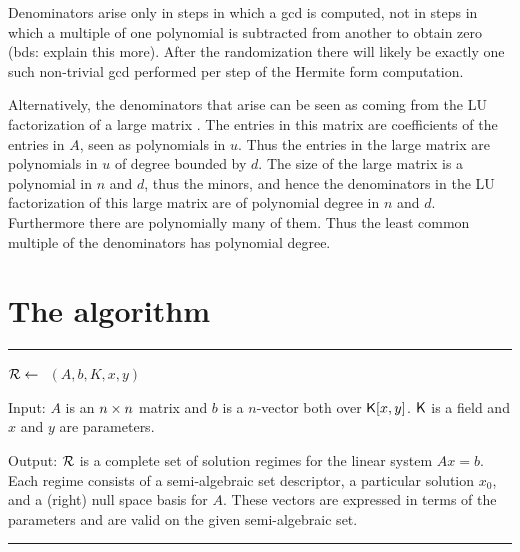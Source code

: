 \documentclass[10pt]{article}
\newcommand{\Line} {\vspace{1ex} \hrule \vspace{1ex}}
\begin{document}
Denominators arise only in steps in which a gcd is computed, 
not in steps in which a multiple of one polynomial is subtracted 
from another to obtain zero (bds: explain this more).  
After the randomization there will likely be exactly one such 
non-trivial gcd performed per step of the Hermite form computation.  

Alternatively, the denominators that arise can be seen as coming 
from the LU factorization of a large matrix \cite{Vil,Lab}.  
The entries in this matrix are coefficients of the entries in $A$, 
seen as polynomials in $u$.  Thus the entries in the large matrix 
are polynomials in $u$ of degree bounded by $d$.  
The size of the large matrix is a polynomial in $n$ and $d$, 
thus the minors, and hence the denominators in the LU factorization 
of this large matrix are of polynomial degree in $n$ and $d$.  
Furthermore there are polynomially many of them.  
Thus the least common multiple of the denominators has polynomial degree.

\newpage
\section{The algorithm}
\Line
\begin{center} ${\cal R} \leftarrow~ $ \StPLS$(A, b, K, x, y) $ \end{center}

Input:
$A$ is an ${n\times n}$ matrix and $b$ is a $n$-vector both over ${\mathsf K}[x,y]$.
${\mathsf K}$ is a field and $x$ and $y$ are parameters.  

Output:
${\cal R}$ is a complete set of solution regimes for the linear system $Ax = b$.
Each regime consists of a semi-algebraic set descriptor, a particular solution $x_0$, 
and a (right) null space basis for $A$.  These vectors are expressed in terms 
of the parameters and are valid on the given semi-algebraic set.
\Line
\end{document}

